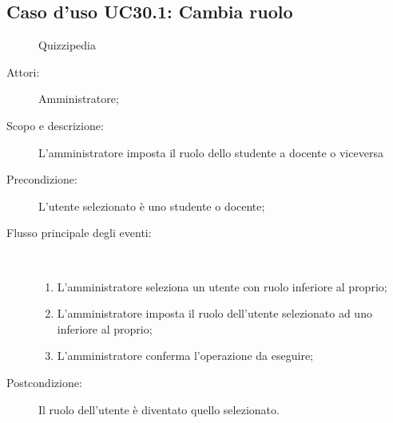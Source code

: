 \subsection{Caso d'uso UC30.1: Cambia ruolo}
	\begin{figure}[H]
		\centering
		\begin{resizedtikzpicture}{\textwidth}
		\begin{umlsystem}[x=0, fill=lightgray!20]{Quizzipedia}
		\end{umlsystem}
		\end{resizedtikzpicture}
		\caption{}
	\end{figure}
\begin{description}
\item[Attori:] Amministratore;
\item[Scopo e descrizione:] L'amministratore imposta il ruolo dello studente a docente o viceversa
      \item[Precondizione:] L'utente selezionato è uno studente o docente;

        \item[Flusso principale degli eventi:] \ 
 \begin{enumerate}
          \item L'amministratore seleziona un utente con ruolo inferiore al proprio;
          \item L'amministratore imposta il ruolo dell'utente selezionato ad uno inferiore al proprio;
          \item L'amministratore conferma l'operazione da eseguire;

      \end{enumerate}
    \item[Postcondizione:] Il ruolo dell'utente è diventato quello selezionato.
  \end{description}
\hypertarget{UC30.2}{}
